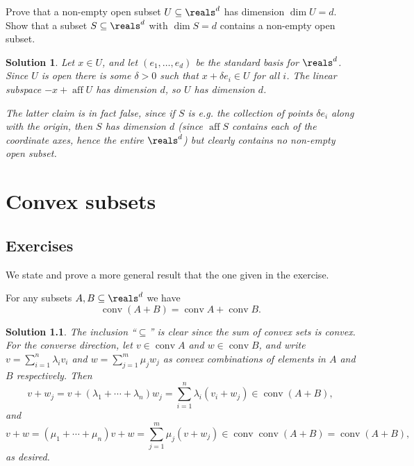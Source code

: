 \documentclass[article, a4paper, 11pt, oneside]{memoir}
\numberwithin{equation}{chapter}
\theoremstyle{nonumberplain}
\newtheorem{solution}{Solution}
\newcommand{\aff}{\operatorname{aff}}
\begin{document}
\begin{exerciseframed*}[12]
    Prove that a non-empty open subset $U \subseteq \reals^d$ has dimension $\dim U = d$. Show that a subset $S \subseteq \reals^d$ with $\dim S = d$ contains a non-empty open subset.
\end{exerciseframed*}

\begin{solution}
    Let $x \in U$, and let $(e_1, \ldots, e_d)$ be the standard basis for $\reals^d$. Since $U$ is open there is some $\delta > 0$ such that $x + \delta e_i \in U$ for all $i$. The linear subspace $-x + \aff U$ has dimension $d$, so $U$ has dimension $d$.

    The latter claim is in fact false, since if $S$ is e.g. the collection of points $\delta e_i$ along with the origin, then $S$ has dimension $d$ (since $\aff S$ contains each of the coordinate axes, hence the entire $\reals^d$) but clearly contains no non-empty open subset.
\end{solution}


\chapter{Convex subsets}

\section*{Exercises}

\newcommand{\conv}{\operatorname{conv}}
\newcommand{\polar}[1]{{#1}^{\circ}}
\newcommand{\trans}{^{\top}}

\begin{exerciseframed*}[7]
    We state and prove a more general result that the one given in the exercise.

    For any subsets $A,B \subseteq \reals^d$ we have
    \begin{equation*}
        \conv (A + B)
            = \conv A + \conv B.
    \end{equation*}
\end{exerciseframed*}

\begin{solution}
    The inclusion \enquote{$\subseteq$} is clear since the sum of convex sets is convex. For the converse direction, let $v \in \conv A$ and $w \in \conv B$, and write $v = \sum_{i=1}^n \lambda_i v_i$ and $w = \sum_{j=1}^m \mu_j w_j$ as convex combinations of elements in $A$ and $B$ respectively. Then
    \begin{equation*}
        v + w_j
            = v + (\lambda_1 + \cdots + \lambda_n)w_j
            = \sum_{i=1}^n \lambda_i (v_i + w_j)
            \in \conv(A + B),
    \end{equation*}
    and
    \begin{equation*}
        v + w
            = (\mu_1 + \cdots + \mu_n)v + w
            = \sum_{j=1}^m \mu_j (v + w_j)
            \in \conv\conv(A + B)
            = \conv(A + B),
    \end{equation*}
    as desired.
\end{solution}
\end{document}
